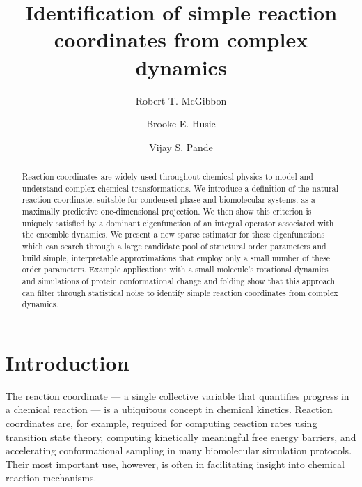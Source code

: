 \documentclass[aip, jcp, reprint, nolinenumbers, twocolumn, nobalancelastpage]{revtex4-1}
\begin{document}
\title{Identification of simple reaction coordinates from complex dynamics}
\author{Robert T. McGibbon}
\author{Brooke E. Husic}
\author{Vijay S. Pande}

\begin{abstract}
Reaction coordinates are widely used throughout chemical physics to model and understand complex chemical transformations. We introduce a definition of the natural reaction coordinate, suitable for condensed phase and biomolecular systems, as a maximally predictive one-dimensional projection. We then show this criterion is uniquely satisfied by a dominant eigenfunction of an integral operator associated with the ensemble dynamics. We present a new sparse estimator for these eigenfunctions which can search through a large candidate pool of structural order parameters and build simple, interpretable approximations that employ only a small number of these order parameters. Example applications with a small molecule's rotational dynamics and simulations of protein conformational change and folding show that this approach can filter through statistical noise to identify simple reaction coordinates from complex dynamics.
\end{abstract}
\maketitle


\section{Introduction}

The reaction coordinate --- a single collective variable that quantifies progress in a chemical reaction ---  is a ubiquitous concept in chemical kinetics.\cite{eyring1935activated, KRAMERS1940284} Reaction coordinates are, for example, required for computing reaction rates using transition state theory,\cite{eyring1935activated, KRAMERS1940284, truhlar1996current} computing kinetically meaningful free energy barriers,\cite{sichun2006effective} and accelerating conformational sampling in many biomolecular simulation protocols.\cite{Bernardi2015Enhanced, laio2002escaping, kastner2011umbrella, knight2009lambda, Torrie1977187} Their most important use, however, is often in facilitating insight into chemical reaction mechanisms.\cite{steinfeld1999chemical, RevModPhys.62.251, peters2015common}
\end{document}
